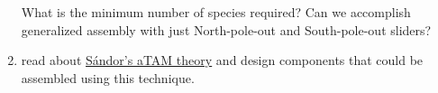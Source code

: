 \documentclass[letterpaper, 10 pt, conference]{ieeeconf}
\begin{document}
\begin{enumerate}
What is the minimum number of species required?  Can we accomplish generalized assembly with just North-pole-out and South-pole-out sliders?

\item read about \href{http://arxiv.org/abs/1408.3351}{S\'{a}ndor's aTAM theory} and design components that could be assembled using this technique.
\end{enumerate}





 


 
 
\end{document}
